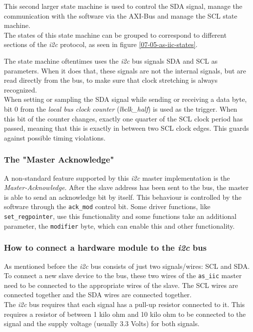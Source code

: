 This second larger state machine is used to control the SDA signal, manage the communication with the software via the AXI-Bus and manage the SCL state machine.\\
The states of this state machine can be grouped to correspond to different sections of the \textit{i2c} protocol, as seen in figure \ref{07-05-as-iic-states}.

The state machine oftentimes uses the \textit{i2c} bus signals SDA and SCL as parameters.
When it does that, these signals are not the internal signals, but are read directly from the bus, to make sure that clock stretching is always recognized.\\
When setting or sampling the SDA signal while sending or receiving a data byte, bit 0 from the \textit{local bus clock counter} (\textit{lbclk\_half}) is used as the trigger.
When this bit of the counter changes, exactly one quarter of the SCL clock period has passed, meaning that this is exactly in between two SCL clock edges. This guards against possible timing violations.

\subsubsection*{The "Master Acknowledge"}

A non-standard feature supported by this \textit{i2c} master implementation is the \textit{Master-Acknowledge}. After the slave address has been sent to the bus, the master is able to send an acknowledge bit by itself.
This behaviour is controlled by the software through the \texttt{ack\_mod} control bit. 
Some driver functions, like \texttt{set\_regpointer}, use this functionality and some functions take an additional parameter, the \texttt{modifier} byte, which can enable this and other functionality.

\subsubsection*{How to connect a hardware module to the \textit{i2c} bus} \label{07-05-as-iic-connect-devices}

As mentioned before the \textit{i2c} bus consists of just two signals/wires: SCL and SDA.
To connect a new slave device to the bus, these two wires of the \texttt{as\_iic} master need to be connected to the appropriate wires of the slave.
The SCL wires are connected together and the SDA wires are connected together.\\
The \textit{i2c} bus requires that each signal has a pull-up resistor connected to it.
This requires a resistor of between 1 kilo ohm and 10 kilo ohm to be connected to the signal and the supply voltage (usually 3.3 Volts) for both signals.

